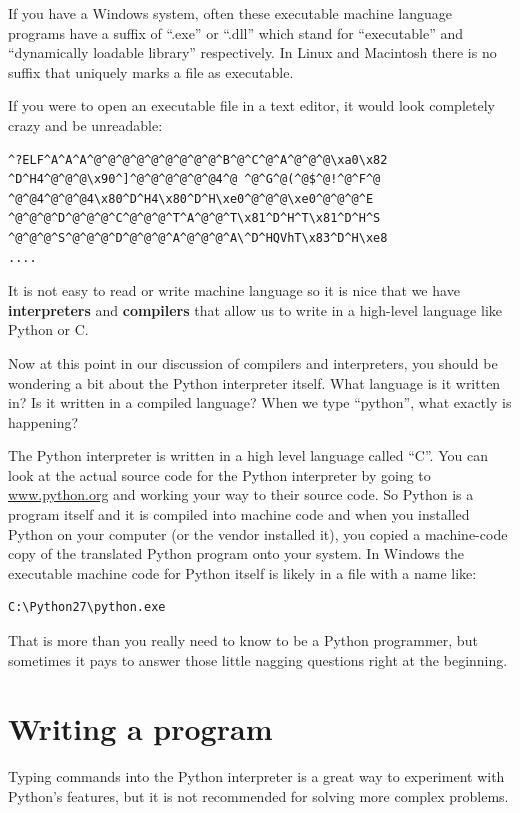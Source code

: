 \documentclass[11pt]{book}
\begin{document}
If you have a Windows system, often these executable machine language programs have a
suffix of ``.exe'' or ``.dll'' which stand for ``executable'' and ``dynamically loadable
library'' respectively.  In Linux and Macintosh there is no suffix that uniquely marks
a file as executable.

If you were to open an executable file in a text editor, it would look 
completely crazy and be unreadable:

\beforeverb
\begin{verbatim}
^?ELF^A^A^A^@^@^@^@^@^@^@^@^@^B^@^C^@^A^@^@^@\xa0\x82
^D^H4^@^@^@\x90^]^@^@^@^@^@^@4^@ ^@^G^@(^@$^@!^@^F^@
^@^@4^@^@^@4\x80^D^H4\x80^D^H\xe0^@^@^@\xe0^@^@^@^E
^@^@^@^D^@^@^@^C^@^@^@^T^A^@^@^T\x81^D^H^T\x81^D^H^S
^@^@^@^S^@^@^@^D^@^@^@^A^@^@^@^A\^D^HQVhT\x83^D^H\xe8
....
\end{verbatim}
\afterverb
%
It is not easy to read or write machine language so it is nice that we have
{\bf interpreters} and {\bf compilers} that allow us to write in a high-level
language like Python or C.

Now at this point in our discussion of compilers and interpreters, you should 
be wondering a bit about the Python interpreter itself.  What language is 
it written in?  Is it written in a compiled language?  When we type
``python'', what exactly is happening?

The Python interpreter is written in a high level language called ``C''.  
You can look at the actual source code for the Python interpreter by
going to \url{www.python.org} and working your way to their source code.
So Python is a program itself and it is compiled into machine code and
when you installed Python on your computer (or the vendor installed it),
you copied a machine-code copy of the translated Python program onto your
system.   In Windows the executable machine code for Python itself is likely
in a file with a name like:

\beforeverb
\begin{verbatim}
C:\Python27\python.exe
\end{verbatim}
\afterverb
%
That is more than you really need to know to be a Python programmer, but
sometimes it pays to answer those little nagging questions right at 
the beginning.

\section{Writing a program}

Typing commands into the Python interpreter is a great way to experiment 
with Python’s features, but it is not recommended for solving more complex problems.
\end{document}
